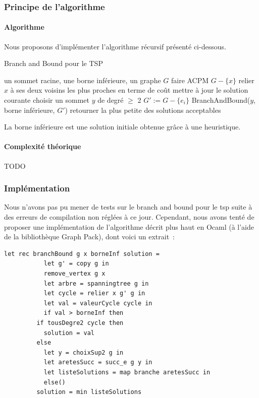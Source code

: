 \documentclass[a4paper, 12pt]{article}
\begin{document}
\subsubsection{Principe de l'algorithme}

\paragraph{Algorithme}

Nous proposons d'implémenter l'algorithme récursif présenté ci-dessous.

\begin{algorithm}[!ht]
\caption{Branch and Bound pour le TSP}
\label{BBtsp}
\begin{algorithmic}[1]
\REQUIRE un sommet racine, une borne inférieure, un graphe $G$
\STATE faire ACPM $G - \{x \}$
\STATE relier $x$ à ses deux voisins les plus proches en terme de coût
\STATE mettre à jour le solution courante
\ELSE
\STATE choisir un sommet $y$ de degré $\geq$ 2
\STATE $G' := G - \{ e_i \}$
\STATE BranchAndBound($y$, borne inférieure, $G'$)
\ENDFOR
\ENDIF
\ENDIF
\STATE retourner la plus petite des solutions acceptables
\end{algorithmic}
\end{algorithm}

La borne inférieure est une solution initiale obtenue grâce à une heuristique.

\paragraph{Complexité théorique}

TODO

\subsubsection{Implémentation}

Nous n'avons pas pu mener de tests sur le branch and bound pour le tsp
suite à des erreurs de compilation non réglées à ce jour. Cependant,
nous avons tenté de proposer une implémentation de l'algorithme décrit plus haut
en Ocaml (à l'aide de la bibliothèque Graph Pack), dont voici un extrait~:
\begin{lstlisting}
let rec branchBound g x borneInf solution = 
	       let g' = copy g in
	       remove_vertex g x
	       let arbre = spanningtree g in
	       let cycle = relier x g' g in 
	       let val = valeurCycle cycle in
	       if val > borneInf then 
		 if tousDegre2 cycle then
		   solution = val
		 else
		   let y = choixSup2 g in
		   let aretesSucc = succ_e g y in 
		   let listeSolutions = map branche aretesSucc in
	       else()
		 solution = min listeSolutions
\end{lstlisting}
\end{document}
